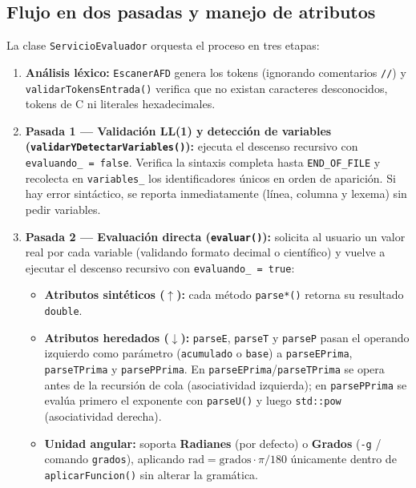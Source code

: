 \documentclass[10pt,a4paper]{article}
\begin{document}
\subsection*{Flujo en dos pasadas y manejo de atributos}
La clase \texttt{ServicioEvaluador} orquesta el proceso en tres etapas:
\begin{enumerate}
    \item \textbf{Análisis léxico:} \texttt{EscanerAFD} genera los tokens (ignorando comentarios \texttt{//}) y \texttt{validarTokensEntrada()} verifica que no existan caracteres desconocidos, tokens de C ni literales hexadecimales.
    \item \textbf{Pasada 1 — Validación LL(1) y detección de variables (\texttt{validarYDetectarVariables()}):} ejecuta el descenso recursivo con \texttt{evaluando\_ = false}. Verifica la sintaxis completa hasta \texttt{END\_OF\_FILE} y recolecta en \texttt{variables\_} los identificadores únicos en orden de aparición. Si hay error sintáctico, se reporta inmediatamente (línea, columna y lexema) sin pedir variables.
    \item \textbf{Pasada 2 — Evaluación directa (\texttt{evaluar()}):} solicita al usuario un valor real por cada variable (validando formato decimal o científico) y vuelve a ejecutar el descenso recursivo con \texttt{evaluando\_ = true}:
    \begin{itemize}
        \item \textbf{Atributos sintéticos ($\uparrow$):} cada método \texttt{parse*()} retorna su resultado \texttt{double}.
        \item \textbf{Atributos heredados ($\downarrow$):} \texttt{parseE}, \texttt{parseT} y \texttt{parseP} pasan el operando izquierdo como parámetro (\texttt{acumulado} o \texttt{base}) a \texttt{parseEPrima}, \texttt{parseTPrima} y \texttt{parsePPrima}. En \texttt{parseEPrima}/\texttt{parseTPrima} se opera antes de la recursión de cola (asociatividad izquierda); en \texttt{parsePPrima} se evalúa primero el exponente con \texttt{parseU()} y luego \texttt{std::pow} (asociatividad derecha).
        \item \textbf{Unidad angular:} soporta \textbf{Radianes} (por defecto) o \textbf{Grados} (\texttt{-g} / comando \texttt{grados}), aplicando $\text{rad} = \text{grados} \cdot \pi/180$ únicamente dentro de \texttt{aplicarFuncion()} sin alterar la gramática.
    \end{itemize}
\end{enumerate}
\end{document}
